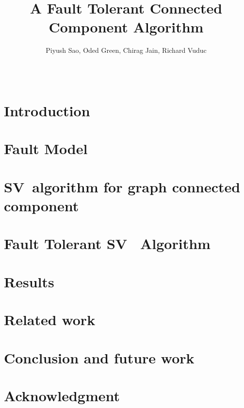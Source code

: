 \documentclass[english]{sig-alternate-05-2015}
\theoremstyle{plain}
\theoremstyle{definition}
\newcommand{\sv}{SV}
\begin{document}

\title{A Fault Tolerant Connected Component Algorithm }

  \author{
  \alignauthor
    Piyush Sao, Oded Green, Chirag Jain, Richard Vuduc \\
      \\
      \\
  }


\maketitle





\section{Introduction}

\label{sec:intro}

\section{Fault Model}

\label{sec:fault}

\section{\sv~algorithm for graph connected component}

\label{sec:connected}

\section{Fault Tolerant \sv~ Algorithm}

\label{sec:ft-connected}


\section{Results}

\label{sec:results}

\section{Related work}

\label{sec:related}

\section{Conclusion and future work}

\label{sec:conclusion}

\section{Acknowledgment}



% 

\end{document}

